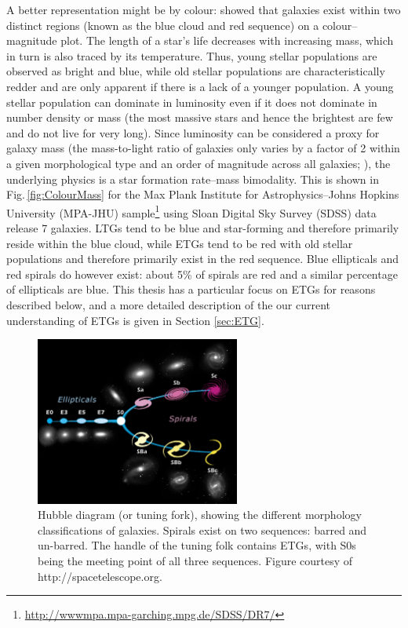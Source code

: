 	A better representation might be by colour: \citet{Baldry2004} showed that galaxies exist within two distinct regions (known as the blue cloud and red sequence) on a colour--magnitude plot. The length of a star's life decreases with increasing mass, which in turn is also traced by its temperature. Thus, young stellar populations are observed as bright and blue, while old stellar populations are characteristically redder and are only apparent if there is a lack of a younger population. A young stellar population can dominate in luminosity even if it does not dominate in number density or mass (the most massive stars and hence the brightest are few and do not live for very long). Since luminosity can be considered a proxy for galaxy mass (the mass-to-light ratio of galaxies only varies by a factor of 2 within a given morphological type and an order of magnitude across all galaxies; \citealt{Faber1979}), the underlying physics is a star formation rate--mass bimodality. This is shown in Fig.\,\ref{fig:ColourMass} for the Max Plank Institute for Astrophysics--Johns Hopkins University (MPA-JHU) sample\footnote{\url{http://wwwmpa.mpa-garching.mpg.de/SDSS/DR7/}} using Sloan Digital Sky Survey (SDSS) data release 7 galaxies. LTGs tend to be blue and star-forming and therefore primarily reside within the blue cloud, while ETGs tend to be red with old stellar populations and therefore primarily exist in the red sequence. Blue ellipticals and red spirals do however exist: about 5\% of spirals are red \citep{Masters2010} and a similar percentage of ellipticals are blue\citep{Schawinski2009}. This thesis has a particular focus on ETGs for reasons described below, and a more detailed description of the our current understanding of ETGs is given in Section \ref{sec:ETG}. 

	\begin{figure}
		\centering
		\includegraphics[width=0.6\textwidth]{introduction/hubble.jpg}
		\caption[The Hubble tuning-fork]{Hubble diagram (or tuning fork), showing the different morphology classifications of galaxies. Spirals exist on two sequences: barred and un-barred. The handle of the tuning folk contains ETGs, with S0s being the meeting point of all three sequences. Figure courtesy of http://spacetelescope.org.}
		\label{fig:Hubble}
	\end{figure}

